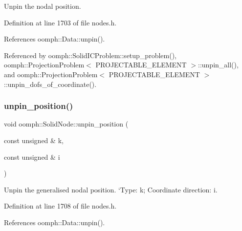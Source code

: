 Unpin the nodal position. 



Definition at line 1703 of file nodes.\+h.



References oomph\+::\+Data\+::unpin().



Referenced by oomph\+::\+Solid\+I\+C\+Problem\+::setup\+\_\+problem(), oomph\+::\+Projection\+Problem$<$ P\+R\+O\+J\+E\+C\+T\+A\+B\+L\+E\+\_\+\+E\+L\+E\+M\+E\+N\+T $>$\+::unpin\+\_\+all(), and oomph\+::\+Projection\+Problem$<$ P\+R\+O\+J\+E\+C\+T\+A\+B\+L\+E\+\_\+\+E\+L\+E\+M\+E\+N\+T $>$\+::unpin\+\_\+dofs\+\_\+of\+\_\+coordinate().

\mbox{\label{classoomph_1_1SolidNode_a3c9577dbae23ec836abf47bf49ea745f}} 
\subsubsection{\texorpdfstring{unpin\+\_\+position()}{unpin\_position()}\hspace{0.1cm}{\footnotesize\ttfamily [2/2]}}
{\footnotesize\ttfamily void oomph\+::\+Solid\+Node\+::unpin\+\_\+position (\begin{DoxyParamCaption}\item[{const unsigned \&}]{k,  }\item[{const unsigned \&}]{i }\end{DoxyParamCaption})\hspace{0.3cm}{\ttfamily [inline]}}



Unpin the generalised nodal position. `\+Type\textquotesingle{}\+: k; Coordinate direction\+: i. 



Definition at line 1708 of file nodes.\+h.



References oomph\+::\+Data\+::unpin().

\mbox{\label{classoomph_1_1SolidNode_a5142f381e58a87e20c7292aebdd7cc19}} 
